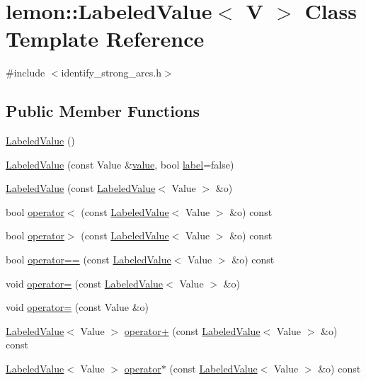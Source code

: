 \hypertarget{classlemon_1_1_labeled_value}{}\section{lemon\+:\+:Labeled\+Value$<$ V $>$ Class Template Reference}
\label{classlemon_1_1_labeled_value}


{\ttfamily \#include $<$identify\+\_\+strong\+\_\+arcs.\+h$>$}

\subsection*{Public Member Functions}
\begin{DoxyCompactItemize}
\item 
\hyperlink{classlemon_1_1_labeled_value_a14eecff046442f7d6ddca93014e95b05}{Labeled\+Value} ()
\item 
\hyperlink{classlemon_1_1_labeled_value_a95f29b1d3308d805fa51a13790cd08f0}{Labeled\+Value} (const Value \&\hyperlink{classlemon_1_1_labeled_value_ad52008450e02d6f966a512f45cccd695}{value}, bool \hyperlink{classlemon_1_1_labeled_value_a2e6cbc625abb719205f698a1ee605f34}{label}=false)
\item 
\hyperlink{classlemon_1_1_labeled_value_a92e5bba9725478c716bf918a98821ebf}{Labeled\+Value} (const \hyperlink{classlemon_1_1_labeled_value}{Labeled\+Value}$<$ Value $>$ \&o)
\item 
bool \hyperlink{classlemon_1_1_labeled_value_ac391a3b4e250a3484f215c1ef3649a28}{operator$<$} (const \hyperlink{classlemon_1_1_labeled_value}{Labeled\+Value}$<$ Value $>$ \&o) const
\item 
bool \hyperlink{classlemon_1_1_labeled_value_afecbbe1dee2fa63f3c8eecbf258e6b81}{operator$>$} (const \hyperlink{classlemon_1_1_labeled_value}{Labeled\+Value}$<$ Value $>$ \&o) const
\item 
bool \hyperlink{classlemon_1_1_labeled_value_a67101fc1931e05d142d79cb0d5c00db3}{operator==} (const \hyperlink{classlemon_1_1_labeled_value}{Labeled\+Value}$<$ Value $>$ \&o) const
\item 
void \hyperlink{classlemon_1_1_labeled_value_adb93ba08026dd33dfb2c4160adf2a81c}{operator=} (const \hyperlink{classlemon_1_1_labeled_value}{Labeled\+Value}$<$ Value $>$ \&o)
\item 
void \hyperlink{classlemon_1_1_labeled_value_aab6fe896646c831d1b6fa4f030b325b2}{operator=} (const Value \&o)
\item 
\hyperlink{classlemon_1_1_labeled_value}{Labeled\+Value}$<$ Value $>$ \hyperlink{classlemon_1_1_labeled_value_a16e6e3856d8afec132b0527dd93dfce5}{operator+} (const \hyperlink{classlemon_1_1_labeled_value}{Labeled\+Value}$<$ Value $>$ \&o) const
\item 
\hyperlink{classlemon_1_1_labeled_value}{Labeled\+Value}$<$ Value $>$ \hyperlink{classlemon_1_1_labeled_value_aaf3a95a408db36775ef7298d9b10f5e5}{operator$\ast$} (const \hyperlink{classlemon_1_1_labeled_value}{Labeled\+Value}$<$ Value $>$ \&o) const
\end{DoxyCompactItemize}
